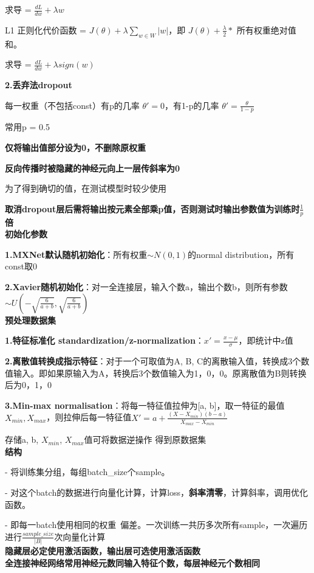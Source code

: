 \documentclass[UTF8]{ctexart}
\begin{document}
  \quad \quad 求导 = $\frac{dL}{dw} + \lambda w$
  
  \quad L1 正则化代价函数 = $J(\theta) + \lambda \sum_{w\in W} |w|$，即 $J(\theta) + \frac{\lambda}{2} * $ 所有权重绝对值和。

  \quad \quad 求导 = $\frac{dL}{dw} + \lambda sign(w)$

  \textbf{2.丢弃法dropout}

  \quad 每一权重（不包括const）有p的几率 $\theta' = 0$，有1-p的几率 $\theta' = \frac{\theta}{1-p}$

  \quad \quad 常用p = 0.5

  \quad \quad \textbf{仅将输出值部分设为0，不删除原权重}

  \quad \quad \textbf{反向传播时被隐藏的神经元向上一层传斜率为0}

  \quad 为了得到确切的值，在测试模型时较少使用
  
  \quad \quad \textbf{取消dropout层后需将输出按元素全部乘p值，否则测试时输出参数值为训练时$\frac{1}{p}$倍}\\
\textbf{初始化参数}

  \textbf{1.MXNet默认随机初始化}：所有权重$\sim N(0, 1)$的normal distribution，所有const取0

  \textbf{2.Xavier随机初始化}：对一全连接层，输入个数a，输出个数b，则所有参数$\sim U(-\sqrt{\frac{6}{a+b}}, \sqrt{\frac{6}{a+b}})$\\
\textbf{预处理数据集}

  \textbf{1.特征标准化 standardization/z-normalization}：$x' = \frac{x - \mu}{\sigma}$，即统计中z值

  \textbf{2.离散值转换成指示特征}：对于一个可取值为A, B, C的离散输入值，转换成3个数值输入。即如果原输入为A，转换后3个数值输入为1，0，0。原离散值为B则转换后为0，1，0
  
  \textbf{3.Min-max normalisation}：将每一特征值拉伸为[a, b]，取一特征的最值$X_{min}, X_{max}$，则拉伸后每一特征值$X' = a + \frac{(X - X_{min})(b - a)}{X_{max} - X_{min}}$
  
  \quad 存储a, b, $X_{min}$, $X_{max}$值可将数据逆操作 得到原数据集\\
\textbf{结构}
  
  - 将训练集分组，每组batch\_size个sample。
  
  - 对这个batch的数据进行向量化计算，计算loss，\textbf{斜率清零}，计算斜率，调用优化函数。

  - 即每一batch使用相同的权重\ 偏差。一次训练一共历多次所有sample，一次遍历进行$\frac{sample\_size}{|B|}$次向量化计算\\
\textbf{隐藏层必定使用激活函数，输出层可选使用激活函数}\\
\textbf{全连接神经网络常用神经元数同输入特征个数，每层神经元个数相同}
\end{document}
